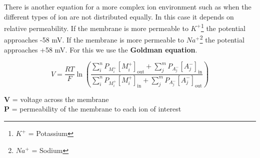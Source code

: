 \documentclass[english]{def}
\begin{document}
There is another equation for a more complex ion environment such as when the different types of ion are not distributed equally. In this case it depends on relative permeability. If the membrane is more permeable to $K^+$\footnote{$K^+$ = Potassium} the potential approaches -58 mV. If the membrane is more permeable to $Na^+$\footnote{$Na^+$ = Sodium} the potential approaches +58 mV. For this we use the \textbf{Goldman equation}.

\[ V={\frac {RT}{F}}\ln {\left({\frac {\sum _{i}^{n}P_{M_{i}^{+}}[M_{i}^{+}]_{\mathrm {out} }+\sum _{j}^{m}P_{A_{j}^{-}}[A_{j}^{-}]_{\mathrm {in} }}{\sum _{i}^{n}P_{M_{i}^{+}}[M_{i}^{+}]_{\mathrm {in} }+\sum _{j}^{m}P_{A_{j}^{-}}[A_{j}^{-}]_{\mathrm {out} }}}\right)}\]

\noindent\textbf{V} = voltage across the membrane\\
\textbf{P} = permeability of the membrane to each ion of interest\\








\end{document}
